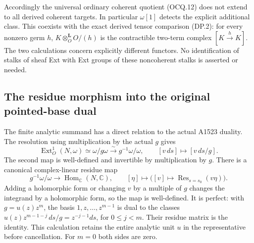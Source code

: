 Accordingly the universal ordinary coherent quotient (OCQ.12) does not
extend to all derived coherent targets.  In particular $\omega[1]$
detects the explicit additional class.  This coexists with the exact
derived tensor comparison (DP.2): for every nonzero germ $h$,
$K\otimes_O^{\mathbf L}O/(h)$ is the contractible two-term complex
$[K\xrightarrow{h}K]$.  The two calculations concern explicitly
different functors.  No identification of stalks of sheaf Ext with
Ext groups of these noncoherent stalks is asserted or needed.

\subsection{The residue morphism into the original pointed-base dual}

The finite analytic summand has a direct relation to the actual A1523
duality.  The resolution using multiplication by the actual $g$ gives
\[
 \operatorname{Ext}^1_O(N,\omega)
       \simeq\omega/g\omega
       \xrightarrow{\sim}g^{-1}\omega/\omega,\qquad
       [v\,ds]\longmapsto[v\,ds/g].                          \tag{OCQ.26}
\]
The second map is well-defined and invertible by multiplication by $g$.
There is a canonical complex-linear residue map
\[
 g^{-1}\omega/\omega\longrightarrow\operatorname{Hom}_{\mathbb C}(N,\mathbb C),
 \qquad [\eta]\longmapsto\bigl([v]\mapsto\operatorname{Res}_{s=s_0}(v\eta)\bigr).
                                                               \tag{OCQ.27}
\]
Adding a holomorphic form or changing $v$ by a multiple of $g$ changes
the integrand by a holomorphic form, so the map is well-defined.
It is perfect: with $g=u(z)z^m$, the basis $1,z,\ldots,z^{m-1}$
is dual to the classes
$u(z)z^{m-1-j}\,ds/g=z^{-j-1}ds$, for $0\le j<m$.
Their residue matrix is the identity.  This calculation retains the
entire analytic unit $u$ in the representative before cancellation.
For $m=0$ both sides are zero.

